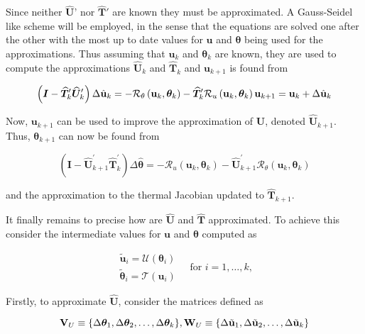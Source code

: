 Since neither $\hat{\mathbf U}’$ nor $\hat{\mathbf T}'$ are known they must be approximated. A Gauss-Seidel like scheme will be employed, in the sense that the equations are solved one after the other with the most up to date values for $\mathbf u$ and $\boldsymbol \theta$ being used for the approximations. Thus assuming that $\mathbf u_k$ and $\boldsymbol \theta_k$ are known, they are used to compute the approximations $\hat{\mathbf U}_k$ and $\hat{\mathbf T}_k$ and $\mathbf u_{k+1}$ is found from

$$
\left(\boldsymbol{I}-\widehat{\boldsymbol{T}}_{k}^{\prime} \widehat{\boldsymbol{U}}_{k}^{\prime}\right) \Delta \hat{\mathbf{u}}_k=-\mathcal{R}_{\theta}\left(\mathbf{u}_{k}, \boldsymbol{\theta}_{k}\right)-\widehat{\boldsymbol{T}}_{k}^{\prime} \mathcal{R}_{u}\left(\mathbf{u}_{k}, \boldsymbol{\theta}_{k}\right)\\ \mathbf{u}_{k+1} = \mathbf{u}_k + \Delta \hat{\mathbf{u}}_k
$$

Now, $\mathbf u_{k+1}$ can be used to improve the approximation of $\hat{\mathbf U}$, denoted $\hat{\mathbf U}_{k+1}$. Thus, $\boldsymbol \theta_{k+1}$ can now be found from

$$
\left(\boldsymbol{I}-\widehat{\boldsymbol{U}}_{k+1}^{\prime} \widehat{\boldsymbol{T}}_{k}^{\prime}\right) \Delta \hat{\boldsymbol{\theta}}=-\mathcal{R}_{u}\left(\mathbf{u}_{k}, \boldsymbol{\theta}_{k}\right)-\widehat{\boldsymbol{U}}_{k+1}^{\prime} \mathcal{R}_{\theta}\left(\mathbf{u}_{k}, \boldsymbol{\theta}_{k}\right)
$$

and the approximation to the thermal Jacobian updated to $\hat{\mathbf T}_{k+1}$.

It finally remains to precise how are $\hat{\mathbf U}$ and $\hat{\mathbf T}$ approximated. To achieve this consider the intermediate values for $\mathbf u$ and $\boldsymbol \theta$ computed as

$$
\begin{array}{l}
\tilde{\mathbf u}_i = \mathcal U(\boldsymbol \theta_i)\\[5pt]
\tilde{\boldsymbol \theta}_i = \mathcal T(\mathbf u_i)
\end{array}\quad \text{for }i=1,\dots,k,
$$

Firstly, to approximate $\hat{\mathbf U}$, consider the matrices defined as

$$
\mathbf V_U \equiv \{\Delta \boldsymbol \theta_1, \Delta \boldsymbol \theta_2, \dots, \Delta \boldsymbol \theta_k\},\\
\mathbf W_U \equiv \{\Delta \tilde{\mathbf u}_1, \Delta \tilde{\mathbf u}_2, \dots, \Delta\tilde{\mathbf u}_k\}
$$

